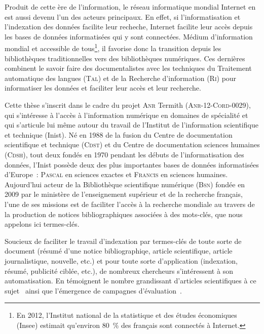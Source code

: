     Produit de cette ère de l'information, le réseau informatique mondial
    Internet en est aussi devenu l'un des acteurs principaux. En effet, si
    l'informatisation et l'indexation des données facilite leur recheche,
    Internet facilite leur accès depuis les bases de données informatisées qui y
    sont connectées. Médium d'information mondial et accessible de
    tous\footnote{En 2012, l'Institut national de la statistique et des études
    économiques (Insee) estimait qu'environ 80~\% des français sont connectés à
    Internet.}, il favorise donc la transition depuis les bibliothèques
    traditionnelles vers des bibliothèques numériques. Ces dernières combinent
    le savoir faire des documentalistes avec les techniques du Traitement
    automatique des langues (\textsc{Tal}) et de la Recherche d'information
    (\textsc{Ri}) pour informatiser les données et faciliter leur accès et leur
    recherche.

    Cette thèse s'inscrit dans le cadre du projet \textsc{Anr} Termith
    (\textsc{Anr-12-Cord-0029}), qui s'intéresse à l'accès à l'information
    numérique en domaines de spécialité et qui s'articule lui même autour du
    travail de l'Institut de l'information scientifique et technique (Inist). Né
    en 1988 de la fusion du Centre de documentation scientifique et technique
    (\textsc{Cdst}) et du Centre de documentation sciences humaines
    (\textsc{Cdsh}), tout deux fondés en 1970 pendant les débuts de
    l'informatisation des données, l'Inist possède deux des plus importantes
    bases de données informatisées d'Europe~: \textsc{Pascal} en sciences
    exactes et \textsc{Francis} en sciences humaines. Aujourd'hui acteur de la
    Bibliothèque scientifique numérique (\textsc{Bsn}) fondée en 2009 par le
    ministère de l'enseignement supérieur et de la recherche français, l'une de
    ses missions est de faciliter l'accès à la recherche mondiale au travers de
    la production de notices bibliographiques associées à des mots-clés, que
    nous appelons ici termes-clés. 

    Soucieux de faciliter le travail d'indexation par termes-clés de toute sorte
    de document (résumé d'une notice bibliographiqe, article scientifique,
    article journalistique, nouvelle, etc.) et pour toute sorte d'application
    (indexation, résumé, publicité ciblée, etc.), de nombreux chercheurs
    s'intéressent à son automatisation. En témoignent le nombre grandissant
    d'articles scientifiques à ce sujet~\cite{hasan2014state_of_the_art} ainsi
    que l'émergence de campagnes
    d'évaluation~\cite{kim2010semeval,paroubek2012deft}.

